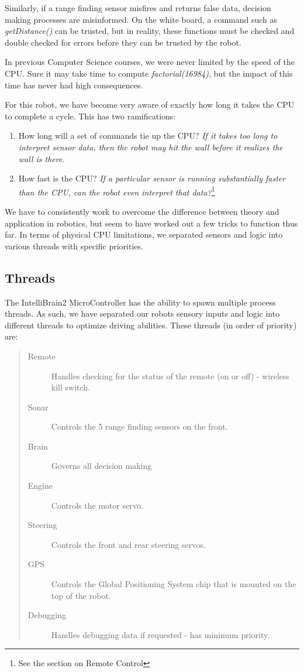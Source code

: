\documentclass[12pt]{article}
\begin{document}
Similarly, if a range finding sensor misfires and returns false data, decision making processes are misinformed.  On the white board, a command such as \textit{getDistance()} can be trusted, but in reality, these functions must be checked and double checked for errors before they can be trusted by the robot.
\vspace{2mm}

In previous Computer Science courses, we were never limited by the speed of the CPU.  Sure it may take time to compute \textit{factorial(16984)}, but the impact of this time has never had high consequences.

For this robot, we have become very aware of exactly how long it takes the CPU to complete a cycle.  This has two ramifications:
\begin{enumerate}
\item How long will a set of commands tie up the CPU? \textit{If it takes too long to interpret sensor data, then the robot may hit the wall before it realizes the wall is there.}
\item How fast is the CPU? \textit{If a particular sensor is running substantially faster than the CPU, can the robot even interpret that data?}\footnote{See the section on Remote Control}
\end{enumerate}

\vspace{2mm}
We have to consistently work to overcome the difference between theory and application in robotics, but seem to have worked out a few tricks to function thus far.  In terms of physical CPU limitations, we separated sensors and logic into various threads with specific priorities.

\clearpage
\subsection{Threads}
The IntelliBrain2 MicroController has the ability to spawn multiple process threads.  As such, we have separated our robots sensory inputs and logic into different threads to optimize driving abilities.  These threads (in order of priority) are:

\begin{quote}
\begin{description}
\item[Remote] Handles checking for the status of the remote (on or off) - wireless kill switch.
\item[Sonar] Controls the 5 range finding sensors on the front.
\item[Brain] Governs all decision making
\item[Engine] Controls the motor servo.
\item[Steering] Controls the front and rear steering servos.
\item[GPS] Controls the Global Positioning System chip that is mounted on the top of the robot.
\item[Debugging] Handles debugging data if requested - has minimum priority.
\end{description}
\end{quote}
\end{document}
